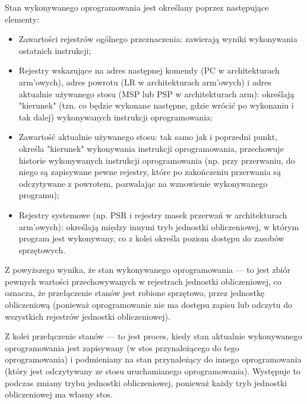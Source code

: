 \documentclass[../main]{subfiles}
\begin{document}
Stan wykonywanego oprogramowania jest określany poprzez następujące elementy:

\begin{itemize}
    \item Zawartości rejestrów ogólnego przeznaczenia: zawierają wyniki wykonywania ostatnich
    instrukcji;
    \item Rejestry wskazujące na adres następnej komendy (PC w architekturach \acrshort{arm}'owych),
    adres powrotu (LR w architekturach \acrshort{arm}'owych) i adres aktualnie używanego stosu (MSP
    lub PSP w architekturach \acrshort{arm}): określają "kierunek" (tzn. co będzie wykonane następne,
    gdzie wrócić po wykonaniu i tak dalej) wykonywanych instrukcji oprogramowania;
    \item Zawartość aktualnie używanego stosu: tak samo jak i poprzedni punkt, określa "kierunek"
    wykonywania instrukcji oprogramowania, przechowuje historie wykonywanych instrukcji oprogramowania
    (np. przy przerwaniu, do niego są zapisywane pewne rejestry, które po zakończeniu przerwania są
    odczytywane z powrotem, pozwalając na wznowienie wykonywanego programu);
    \item Rejestry systemowe (np. PSR i rejestry masek przerwań w architekturach \acrshort{arm}'owych):
    określają między innymi tryb jednostki obliczeniowej, w którym program jest wykonywany, co z kolei
    określa poziom dostępu do zasobów sprzętowych.
\end{itemize}

Z powyższego wynika, że stan wykonywanego oprogramowania — to jest zbiór pewnych wartości
przechowywanych w rejestrach jednostki obliczeniowej, co oznacza, że przełączenie stanów jest robione
sprzętowo, przez jednostkę obliczeniową (ponieważ oprogramowanie nie ma dostępu zapisu lub odczytu do
wszystkich rejestrów jednostki obliczeniowej).

Z kolei przełączenie stanów — to jest proces, kiedy stan aktualnie wykonywanego oprogramowania jest
zapisywany (w stos przynależącego do tego oprogramowania) i podmieniany na stan przynależący do innego
oprogramowania (który jest odczytywany ze stosu uruchamianego oprogramowania). Występuje to podczas
zmiany trybu jednostki obliczeniowej, ponieważ każdy tryb jednostki obliczeniowej ma własny stos.
\end{document}

